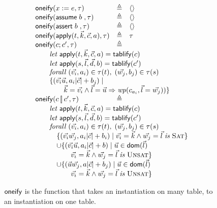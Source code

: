 \begin{figure}[pt]
  \newcommand{\linedef}[1]{\multicolumn{3}{>{\qquad}l}{#1}}
  \[
    \begin{array}{lcl}
      \oneify(x:=e, \tau)
      &\triangleq& \langle \rangle \\
      \oneify(\assume b, \tau)
      &\triangleq& \langle \rangle \\
      \oneify(\assert b, \tau)
      &\triangleq& \langle \rangle \\
      \oneify(\apply{t, \vec k, \vec c, a}, \tau)
      &\triangleq&  \tau \\
      \oneify(c;c', \tau)
      &\triangleq& \\
      \linedef{\mathit{let}\; \apply{t, \vec k, \vec c, a} = \tablify{c}} \\
      \linedef{\mathit {let}\; \apply{s, \vec l, \vec d, b} = \tablify {c'}} \\
      \linedef{\mathit {forall}\; (\vec{v_i}, a_i) \in \tau(t),\; (\vec{w_j}, b_j) \in \tau(s)} \\
      \linedef{\{ (\vec{v_i}\vec{u},a_i|\vec c| + b_j) \mid }\\
      \linedef{\qquad \vec{k} = \vec{v_i}\wedge \vec{l} = \vec{u} \Rightarrow \wp(c_{a_i}, \vec l = \vec{w_j})) \}} \\
      \oneify(c \angel c', \tau)
      & \triangleq & \\
      \linedef{\mathit{let}\; \apply{t, \vec k, \vec c, a} = \tablify{c}} \\
      \linedef{\mathit{let}\; \apply{s, \vec l, \vec d, b} = \tablify{c'}} \\
      \linedef{\mathit{forall}\; (\vec{v_i}, a_i) \in \tau(t),\; (\vec{w_j}, b_j) \in \tau(s)} \\
      \linedef{\quad \{(\vec{v_i}\vec{w_j}, a_i|\vec c| +  b_i) \mid \vec{v_i} = \vec k \wedge \vec{w_j} = \vec l\; \mathit{is}\; \textsc{Sat}\} }\\
      \linedef{\quad \cup\{ (\vec{v_i}\vec{u},a_i|\vec c| + b) \mid  \vec u \in \textsf{dom}(\vec l)}\\
      \linedef{\quad\qquad \vec{v_i} = \vec k \wedge \vec{w_j} = \vec l\; \mathit{is}\; \textsc{Unsat}\}} \\
      \linedef{\quad \cup\{ (\vec{u}\vec{w_j}, a|\vec c| +  b_j) \mid  \vec u \in \textsf{dom}(\vec l)}\\
      \linedef{\quad\qquad \vec{v_i} = \vec k \wedge \vec{w_j} = \vec l\; \mathit{is}\; \textsc{Unsat}\}} \\
      \end{array}
  \]
  \caption{$\mathsf{oneify}$ is the function that takes an instantiation on many
    table, to an instantiation on one table.}
\end{figure}

